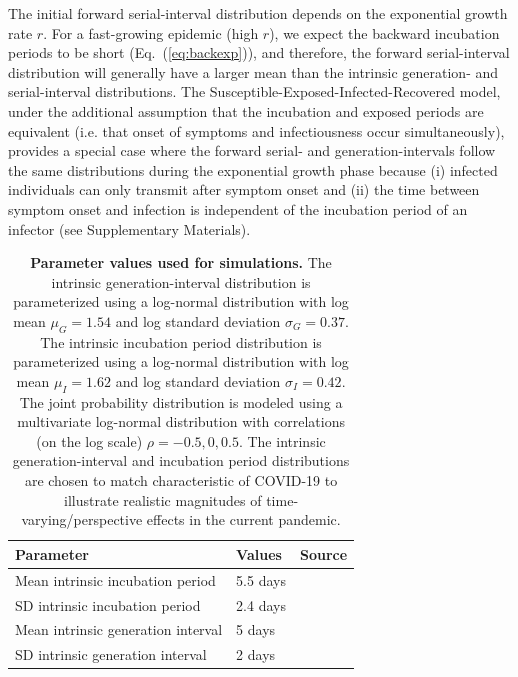 \documentclass[12pt]{article}
\newcommand{\eref}[1]{Eq.~(\ref{eq:#1})}
\begin{document}
The initial forward serial-interval distribution depends on the exponential growth rate $r$.
For a fast-growing epidemic (high $r$), we expect the backward incubation periods to be short (\eref{backexp}), and therefore, the forward serial-interval distribution will generally have a larger mean than the intrinsic generation- and serial-interval distributions.
The Susceptible-Exposed-Infected-Recovered model, under the additional assumption that the incubation and exposed periods are equivalent (i.e. that onset of symptoms and infectiousness occur simultaneously), provides a special case where the forward serial- and generation-intervals follow the same distributions during the exponential growth phase because (i) infected individuals can only transmit after symptom onset and (ii) the time between symptom onset and infection is independent of the incubation period of an infector (see Supplementary Materials).

\begin{table}[!th]
\begin{center}
\begin{tabular}{|l|l|r|}
\hline
Parameter & Values & Source\\
\hline
Mean intrinsic incubation period & 5.5 days & \cite{lauer2020incubation} \\
SD intrinsic incubation period & 2.4 days & \cite{lauer2020incubation} \\
Mean intrinsic generation interval & 5 days & \cite{ferretti2020quantifying} \\
SD intrinsic generation interval & 2 days & \cite{ferretti2020quantifying} \\
\hline
\end{tabular}
\end{center}
\caption{
  \textbf{Parameter values used for simulations.}
The intrinsic generation-interval distribution is parameterized using a log-normal distribution with log mean $\mu_G=1.54$ and log standard deviation $\sigma_G=0.37$.
The intrinsic incubation period distribution is parameterized using a log-normal distribution with log mean $\mu_I=1.62$ and log standard deviation $\sigma_I=0.42$.
The joint probability distribution is modeled using a multivariate log-normal distribution with correlations (on the log scale) $\rho=-0.5, 0, 0.5$.
The intrinsic generation-interval and incubation period distributions are chosen to match characteristic of COVID-19 to illustrate realistic magnitudes of time-varying/perspective effects in the current pandemic.
}
\end{table}
\end{document}
